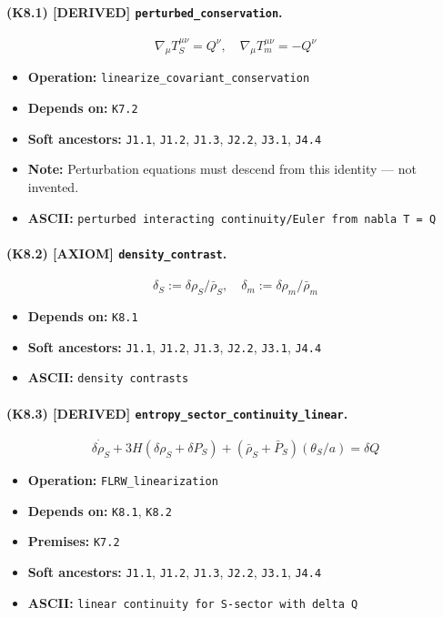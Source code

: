 \documentclass[11pt,a4paper]{article}
\theoremstyle{remark}\newtheorem*{caution}{Caution}
\newcommand{\tagbox}[1]{\textsc{[#1]}}
\begin{document}
\paragraph{(K8.1) \tagbox{DERIVED} \texttt{perturbed\_conservation}.}
\begin{equation}
\nabla_\mu T_S^{\mu\nu}=Q^\nu,\quad \nabla_\mu T_m^{\mu\nu}=-Q^\nu
\tag{K8.1}
\end{equation}
\begin{itemize}\setlength{\itemsep}{0.12em}
\item \textbf{Operation:} \texttt{linearize\_covariant\_conservation}
\item \textbf{Depends on:} \texttt{K7.2}
\item \textbf{Soft ancestors:} \texttt{J1.1}, \texttt{J1.2}, \texttt{J1.3}, \texttt{J2.2}, \texttt{J3.1}, \texttt{J4.4}
\item \textbf{Note:} Perturbation equations must descend from this identity — not invented.
\item \textbf{ASCII:} \texttt{perturbed interacting continuity/Euler from nabla T = Q}
\end{itemize}
\paragraph{(K8.2) \tagbox{AXIOM} \texttt{density\_contrast}.}
\begin{equation}
\delta_S:=\delta\rho_S/\bar\rho_S,\quad \delta_m:=\delta\rho_m/\bar\rho_m
\tag{K8.2}
\end{equation}
\begin{itemize}\setlength{\itemsep}{0.12em}
\item \textbf{Depends on:} \texttt{K8.1}
\item \textbf{Soft ancestors:} \texttt{J1.1}, \texttt{J1.2}, \texttt{J1.3}, \texttt{J2.2}, \texttt{J3.1}, \texttt{J4.4}
\item \textbf{ASCII:} \texttt{density contrasts}
\end{itemize}
\paragraph{(K8.3) \tagbox{DERIVED} \texttt{entropy\_sector\_continuity\_linear}.}
\begin{equation}
\dot{\delta\rho_S}+3H(\delta\rho_S+\delta P_S)+(\bar\rho_S+\bar P_S)(\theta_S/a)=\delta Q
\tag{K8.3}
\end{equation}
\begin{itemize}\setlength{\itemsep}{0.12em}
\item \textbf{Operation:} \texttt{FLRW\_linearization}
\item \textbf{Depends on:} \texttt{K8.1}, \texttt{K8.2}
\item \textbf{Premises:} \texttt{K7.2}
\item \textbf{Soft ancestors:} \texttt{J1.1}, \texttt{J1.2}, \texttt{J1.3}, \texttt{J2.2}, \texttt{J3.1}, \texttt{J4.4}
\item \textbf{ASCII:} \texttt{linear continuity for S-sector with delta Q}
\end{itemize}
\end{document}
